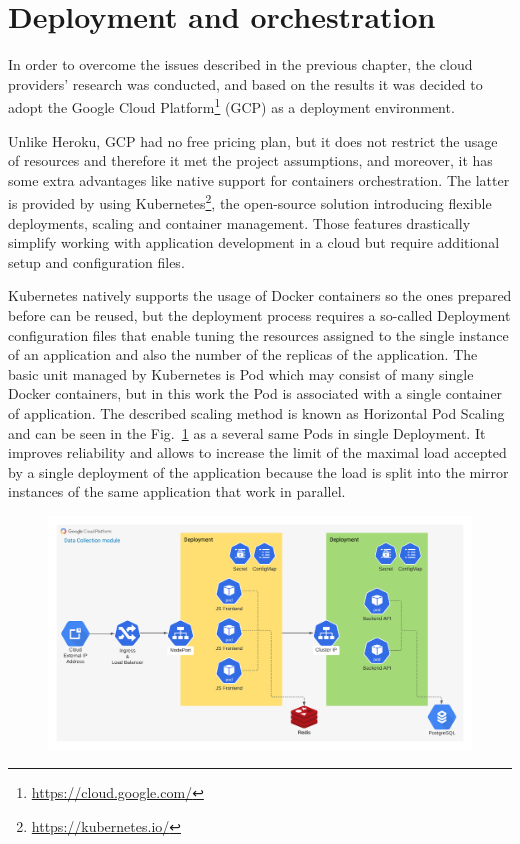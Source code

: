 \section{Deployment and orchestration}\label{sec:deployment-and-orchestration}
In order to overcome the issues described in the previous chapter, the cloud providers' research was conducted, and based on the results it was decided to adopt the Google Cloud Platform\footnote{\url{https://cloud.google.com/}} (GCP) as a deployment environment.

Unlike Heroku, GCP had no free pricing plan, but it does not restrict the usage of resources and therefore it met the project assumptions, and moreover, it has some extra advantages like native support for containers orchestration.
The latter is provided by using Kubernetes\footnote{\url{https://kubernetes.io/}}, the open-source solution introducing flexible deployments, scaling and container management.
Those features drastically simplify working with application development in a cloud but require additional setup and configuration files.

Kubernetes natively supports the usage of Docker containers so the ones prepared before can be reused, but the deployment process requires a so-called Deployment configuration files that enable tuning the resources assigned to the single instance of an application and also the number of the replicas of the application.
The basic unit managed by Kubernetes is Pod which may consist of many single Docker containers, but in this work the Pod is associated with a single container of application.
The described scaling method is known as Horizontal Pod Scaling and can be seen in the Fig.~\ref{fig:gcp_diagram} as a several same Pods in single Deployment.
It improves reliability and allows to increase the limit of the maximal load accepted by a single deployment of the application because the load is split into the mirror instances of the same application that work in parallel.

\begin{figure}
    \includegraphics[width=\linewidth]{resources/gcp_diagram}
    \label{fig:gcp_diagram}
\end{figure}

